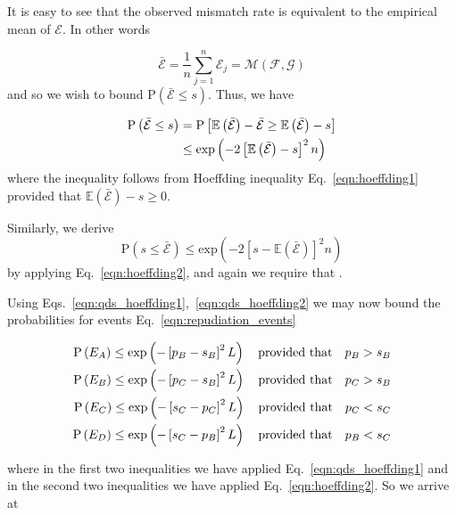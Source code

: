 It is easy to see that the observed mismatch rate is equivalent to the empirical mean of $\mathcal{E}$. In other words

\begin{equation}
\bar{\mathcal{E}} = \frac{1}{n} \sum_{j=1}^n \mathcal{E}_j = \mathcal{M}\left(\mathcal{F}, \mathcal{G}\right)
\end{equation}
and so we wish to bound $\text{P}\left(\bar{\mathcal{E}} \le s\right)$. Thus, we have

\begin{align}\label{eqn:qds_hoeffding1}
\text{P}\left(\bar{\mathcal{E}} \le s \right) &= \text{P}\left[\mathbb{E}\left(\bar{\mathcal{E}}\right) - \bar{\mathcal{E}} \ge \mathbb{E}\left(\bar{\mathcal{E}}\right) - s\right] \notag \\
&\le \text{exp}\left(- 2 \left[\mathbb{E}\left(\bar{\mathcal{E}}\right) - s\right]^2 n \right)
\end{align}
where the inequality follows from Hoeffding inequality Eq.~\ref{eqn:hoeffding1} provided that $\mathbb{E}\left(\bar{\mathcal{E}}\right) - s \ge 0$.

Similarly, we derive
\begin{equation}\label{eqn:qds_hoeffding2}
\text{P}\left(s \le \bar{\mathcal{E}}\right) \le \text{exp}\left( - 2 \left[s - \mathbb{E}\left(\bar{\mathcal{E}}\right)\right]^2 n\right)
\end{equation}
by applying Eq.~\ref{eqn:hoeffding2}, and again we require that .

Using Eqs.~\ref{eqn:qds_hoeffding1},~\ref{eqn:qds_hoeffding2} we may now bound the probabilities for events Eq.~\ref{eqn:repudiation_events}

\begin{align}\label{eqn:qds_repudiation_events_probs}
\text{P}\left(E_A\right) \le \text{exp}\left( -\left[p_B - s_B\right]^2 L \right) \qq{provided that} p_B > s_B \notag \\
\text{P}\left(E_B\right) \le \text{exp}\left( -\left[p_C - s_B\right]^2 L \right) \qq{provided that} p_C > s_B \notag \\
\text{P}\left(E_C\right) \le \text{exp}\left( -\left[s_C - p_C\right]^2 L \right) \qq{provided that} p_C < s_C \notag \\
\text{P}\left(E_D\right) \le \text{exp}\left( -\left[s_C - p_B\right]^2 L \right) \qq{provided that} p_B < s_C
\end{align}

\noindent where in the first two inequalities we have applied Eq.~\ref{eqn:qds_hoeffding1} and in the second two inequalities we have applied Eq.~\ref{eqn:hoeffding2}. So we arrive at

